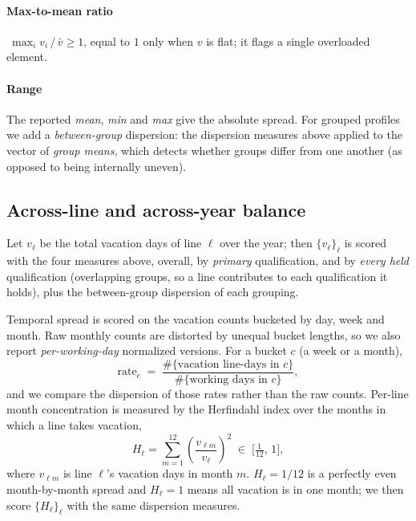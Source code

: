 \documentclass[preprint,12pt]{elsarticle}
\begin{document}
   \paragraph{Max-to-mean ratio} $\ \max_i v_i \,/\, \bar v \ge 1$, equal to $1$ only when $v$ is flat; it flags a single overloaded element.

   \paragraph{Range} The reported \emph{mean}, \emph{min} and \emph{max} give the absolute spread. For grouped profiles we add a \emph{between-group} dispersion: the dispersion measures above applied to the vector of \emph{group means}, which detects whether groups differ from one another (as opposed to being internally uneven).

   \subsection{Across-line and across-year balance} \label{subsec:across_line_year}
   Let $v_\ell$ be the total vacation days of line $\ell$ over the year; then $\{v_\ell\}_\ell$ is scored with the four measures above, overall, by \emph{primary} qualification, and by \emph{every held} qualification (overlapping groups, so a line contributes to each qualification it holds), plus the between-group dispersion of each grouping.

   Temporal spread is scored on the vacation counts bucketed by day, week and month. Raw monthly counts are distorted by unequal bucket lengths, so we also report \emph{per-working-day} normalized versions. For a bucket $c$ (a week or a month),
   \begin{equation}
      \mathrm{rate}_c \;=\;
      \frac{\#\{\text{vacation line-days in } c\}}{\#\{\text{working days in } c\}},
   \end{equation}
   and we compare the dispersion of those rates rather than the raw counts. Per-line month concentration is measured by the Herfindahl index over the months in which a line takes vacation,
   \begin{equation}
      H_\ell = \sum\limits_{m=1}^{12}\left(\frac{v_{\ell m}}{v_\ell}\right)^{2}
            \;\in\; \Big[\tfrac1{12},\,1\Big],
   \end{equation}
   where $v_{\ell m}$ is line $\ell$'s vacation days in month $m$. $H_\ell = 1/12$ is a perfectly even month-by-month spread and $H_\ell = 1$ means all vacation is in one month; we then score $\{H_\ell\}_\ell$ with the same dispersion measures.
\end{document}
